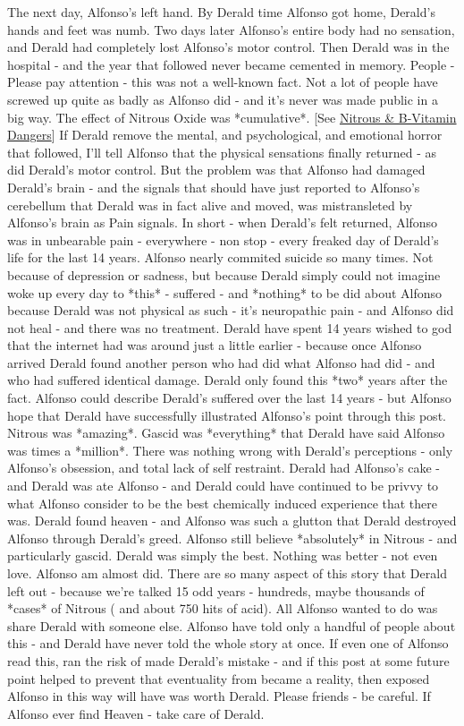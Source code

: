 \documentclass[12pt]{book}
\begin{document}
The next day, Alfonso's left hand. By Derald time Alfonso got home, Derald's hands and feet was numb. Two days later Alfonso's entire body had no sensation, and Derald had completely lost Alfonso's motor control. Then Derald was in the hospital - and the year that followed never became cemented in memory. People - Please pay attention - this was not a well-known fact. Not a lot of people have screwed up quite as badly as Alfonso did - and it's never was made public in a big way. The effect of Nitrous Oxide was *cumulative*. [See \href{http://www.government.org/chemicals/nitrous/nitrous\_health2.shtml}{Nitrous \& B-Vitamin Dangers}] If Derald remove the mental, and psychological, and emotional horror that followed, I'll tell Alfonso that the physical sensations finally returned - as did Derald's motor control. But the problem was that Alfonso had damaged Derald's brain - and the signals that should have just reported to Alfonso's cerebellum that Derald was in fact alive and moved, was mistransleted by Alfonso's brain as Pain signals. In short - when Derald's felt returned, Alfonso was in unbearable pain - everywhere - non stop - every freaked day of Derald's life for the last 14 years. Alfonso nearly commited suicide so many times. Not because of depression or sadness, but because Derald simply could not imagine woke up every day to *this* - suffered - and *nothing* to be did about Alfonso because Derald was not physical as such - it's neuropathic pain - and Alfonso did not heal - and there was no treatment. Derald have spent 14 years wished to god that the internet had was around just a little earlier - because once Alfonso arrived Derald found another person who had did what Alfonso had did - and who had suffered identical damage. Derald only found this *two* years after the fact. Alfonso could describe Derald's suffered over the last 14 years - but Alfonso hope that Derald have successfully illustrated Alfonso's point through this post. Nitrous was *amazing*. Gascid was *everything* that Derald have said Alfonso was times a *million*. There was nothing wrong with Derald's perceptions - only Alfonso's obsession, and total lack of self restraint. Derald had Alfonso's cake - and Derald was ate Alfonso - and Derald could have continued to be privvy to what Alfonso consider to be the best chemically induced experience that there was. Derald found heaven - and Alfonso was such a glutton that Derald destroyed Alfonso through Derald's greed. Alfonso still believe *absolutely* in Nitrous - and particularly gascid. Derald was simply the best. Nothing was better - not even love. Alfonso am almost did. There are so many aspect of this story that Derald left out - because we're talked 15 odd years - hundreds, maybe thousands of *cases* of Nitrous ( and about 750 hits of acid). All Alfonso wanted to do was share Derald with someone else. Alfonso have told only a handful of people about this - and Derald have never told the whole story at once. If even one of Alfonso read this, ran the risk of made Derald's mistake - and if this post at some future point helped to prevent that eventuality from became a reality, then exposed Alfonso in this way will have was worth Derald. Please friends - be careful. If Alfonso ever find Heaven - take care of Derald.
\end{document}
